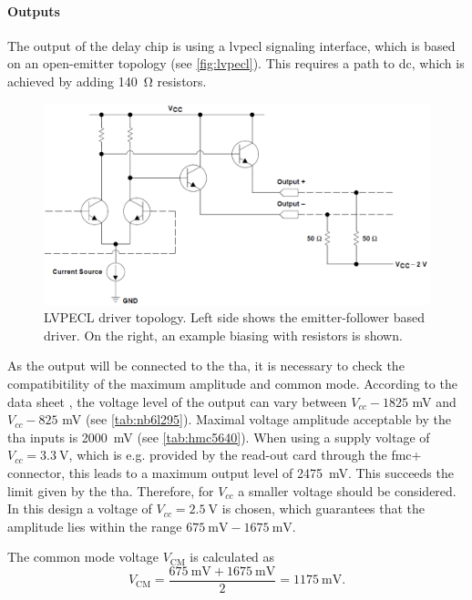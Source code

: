 \paragraph{Outputs}
The output of the delay chip is using a \gls{lvpecl} signaling interface, which is based on an open-emitter topology (see \autoref{fig:lvpecl}). This requires a path to \gls{dc}, which is achieved by adding \SI{140}{\ohm} resistors.
\begin{figure}[tbh]
	\centering
	\includegraphics[width = \textwidth]{chap/04-work/img/lvpecl}
	\caption[LVPECL driver topology]{LVPECL driver topology. Left side shows the emitter-follower based driver. On the right, an example biasing with resistors is shown. \cite{lvpecl}}
	\label{fig:lvpecl}
\end{figure}

As the output will be connected to the \gls{tha}, it is necessary to check the compatibitility of the maximum amplitude and common mode. According to the data sheet \cite{NB6L295}, the voltage level of the output can vary between  $V_{cc} - 1825$ mV and $V_{cc} - 825$ mV (see \autoref{tab:nb6l295}).  Maximal voltage amplitude acceptable by the \gls{tha} inputs is \SI{2000}{\milli \volt} (see \autoref{tab:hmc5640}). When using a supply voltage of $V_{cc} = \SI{3.3}{\volt}$, which is e.g. provided by the read-out card through the \gls{fmc}+ connector, this leads to a maximum output level of \SI{2475}{\milli \volt}. This succeeds the limit given by the \gls{tha}. Therefore, for $V_{cc}$ a smaller voltage should be considered. In this design a voltage of $V_{cc} = \SI{2.5}{\volt}$ is chosen, which guarantees that the amplitude lies within the range $\SI{675}{\milli \volt} - \SI{1675}{\milli \volt}$.

The common mode voltage $V_{\text{CM}}$ is calculated as
\begin{equation}
	V_{\text{CM}} = \frac{\SI{675}{\milli \volt} + \SI{1675}{\milli \volt}}{2} = \SI{1175}{\milli \volt}.
\end{equation}


